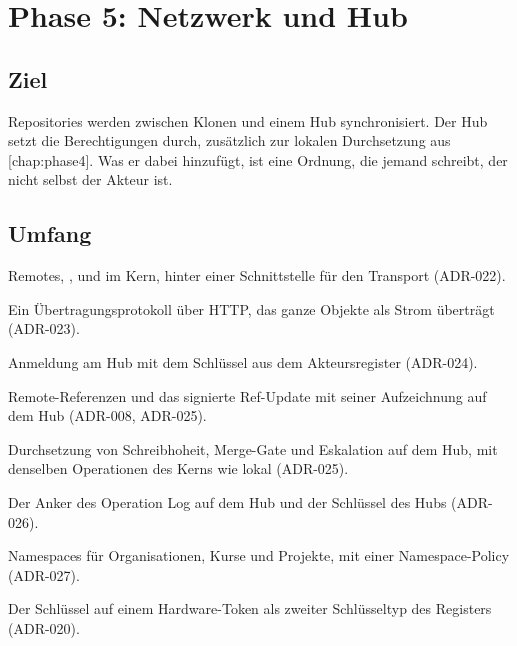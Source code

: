 \chapter[chap:phase5]{Phase 5: Netzwerk und Hub}

\section{Ziel}

Repositories werden zwischen Klonen und einem Hub synchronisiert.
Der Hub setzt die Berechtigungen durch, zusätzlich zur lokalen Durchsetzung aus
[chap:phase4].
Was er dabei hinzufügt, ist eine Ordnung, die jemand schreibt, der nicht selbst der Akteur ist.

\section{Umfang}

\startitemize
\item Remotes, ,  und  im Kern, hinter einer Schnittstelle für
den Transport (ADR-022).
\item Ein Übertragungsprotokoll über HTTP, das ganze Objekte als Strom überträgt (ADR-023).
\item Anmeldung am Hub mit dem Schlüssel aus dem Akteursregister (ADR-024).
\item Remote-Referenzen und das signierte Ref-Update mit seiner Aufzeichnung auf dem Hub
(ADR-008, ADR-025).
\item Durchsetzung von Schreibhoheit, Merge-Gate und Eskalation auf dem Hub, mit denselben
Operationen des Kerns wie lokal (ADR-025).
\item Der Anker des Operation Log auf dem Hub und der Schlüssel des Hubs (ADR-026).
\item Namespaces für Organisationen, Kurse und Projekte, mit einer Namespace-Policy (ADR-027).
\item Der Schlüssel auf einem Hardware-Token als zweiter Schlüsseltyp des Registers (ADR-020).
\stopitemize

